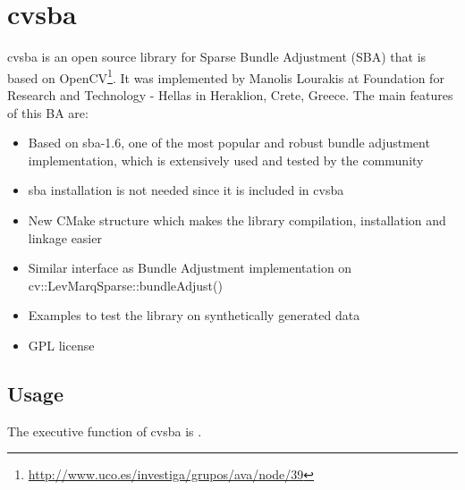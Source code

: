 \section{cvsba}
cvsba is an open source library for Sparse Bundle Adjustment (SBA) that is based on OpenCV\footnote{\url{http://www.uco.es/investiga/grupos/ava/node/39}}. It was implemented by Manolis Lourakis at Foundation for Research and Technology - Hellas in Heraklion, Crete, Greece. The main features of this BA are:
\begin{itemize}
\item Based on sba-1.6, one of the most popular and robust bundle adjustment implementation, which is extensively used and tested by the community
\item sba installation is not needed since it is included in cvsba
\item New CMake structure which makes the library compilation, installation and linkage easier
\item Similar interface as Bundle Adjustment implementation on cv::LevMarqSparse::bundleAdjust()
\item Examples to test the library on synthetically generated data
\item GPL license
\end{itemize}

\subsection{Usage}
The executive function of cvsba is . 

